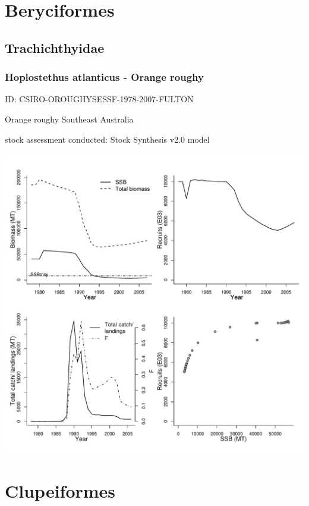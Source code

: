 \section{Beryciformes}

\subsection{Trachichthyidae}

\subsubsection{Hoplostethus atlanticus - Orange roughy}
ID: CSIRO-OROUGHYSESSF-1978-2007-FULTON

Orange roughy Southeast Australia 

stock assessment conducted: Stock Synthesis v2.0 model 
\begin{center}
\vspace{-0.2cm}\includegraphics[scale=0.65]{../tex/figures/plot-CSIRO-OROUGHYSESSF-1978-2007-FULTON.pdf}
\end{center}

\newpage
\section{Clupeiformes}

